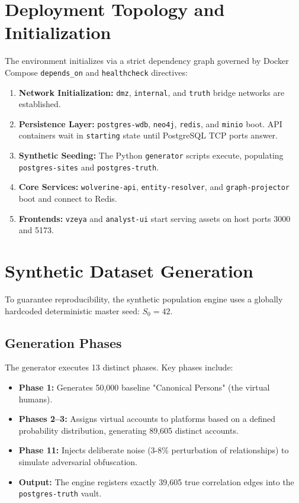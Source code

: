 \section{Deployment Topology and Initialization}
\label{sec:exp-deployment}
The environment initializes via a strict dependency graph governed by Docker Compose \texttt{depends\_on} and \texttt{healthcheck} directives:
\begin{enumerate}
    \item \textbf{Network Initialization:} \texttt{dmz}, \texttt{internal}, and \texttt{truth} bridge networks are established.
    \item \textbf{Persistence Layer:} \texttt{postgres-wdb}, \texttt{neo4j}, \texttt{redis}, and \texttt{minio} boot. API containers wait in \texttt{starting} state until PostgreSQL TCP ports answer.
    \item \textbf{Synthetic Seeding:} The Python \texttt{generator} scripts execute, populating \texttt{postgres-sites} and \texttt{postgres-truth}.
    \item \textbf{Core Services:} \texttt{wolverine-api}, \texttt{entity-resolver}, and \texttt{graph-projector} boot and connect to Redis.
    \item \textbf{Frontends:} \texttt{vzeya} and \texttt{analyst-ui} start serving assets on host ports 3000 and 5173.
\end{enumerate}

\section{Synthetic Dataset Generation}
\label{sec:exp-dataset}
To guarantee reproducibility, the synthetic population engine uses a globally hardcoded deterministic master seed: $S_0 = 42$.

\subsection{Generation Phases}
The generator executes 13 distinct phases. Key phases include:
\begin{itemize}
    \item \textbf{Phase 1:} Generates 50,000 baseline "Canonical Persons" (the virtual humans).
    \item \textbf{Phases 2--3:} Assigns virtual accounts to platforms based on a defined probability distribution, generating 89,605 distinct accounts.
    \item \textbf{Phase 11:} Injects deliberate noise (3-8\% perturbation of relationships) to simulate adversarial obfuscation.
    \item \textbf{Output:} The engine registers exactly 39,605 true correlation edges into the \texttt{postgres-truth} vault.
\end{itemize}

